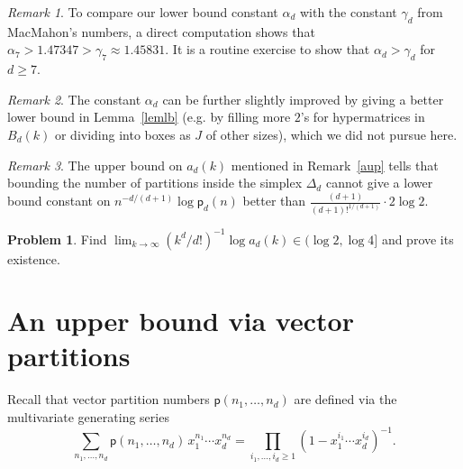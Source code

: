 \documentclass[12pt]{amsart}
\theoremstyle{definition}
\newtheorem{problem}[theorem]{Problem}
\theoremstyle{remark}
\newtheorem{remark}{Remark}
\begin{document}
\begin{remark}
To compare our lower bound constant $\alpha_d$ with the constant $\gamma_d$ from MacMahon's numbers, a direct computation shows that  
$\alpha_7 > 1.47347 > \gamma_7 \approx 1.45831$. It is a routine exercise to show that $\alpha_d > \gamma_d$ for $d \ge 7$. 
\end{remark}

\begin{remark}
The constant $\alpha_d$ can be further slightly improved by giving a better lower bound in Lemma~\ref{lemlb} (e.g. by filling more $2$'s for hypermatrices in $B_d(k)$ or dividing into boxes as $J$ of other sizes), which we did not pursue here.   
\end{remark}

\begin{remark}
The upper bound on $a_d(k)$ mentioned in Remark~\ref{aup} tells that bounding the number of partitions inside the simplex $\Delta_d$ cannot give a lower bound constant on $n^{-d/(d+1)} {\log \mathsf{p}}_d(n)$ better than $\frac{(d+1)}{(d+1)!^{1/(d+1)}} \cdot 2 \log 2$. %
\end{remark}

\begin{problem}
Find %
$
\lim_{k \to \infty} ({k^d/d!})^{-1} {\log a_d(k)} \in (\log 2, \log 4]
$
and prove its existence. %
\end{problem}


\section{An upper bound via vector partitions}\label{secvec}

Recall that vector partition numbers $\mathsf{p}(n_1,\ldots, n_d)$ are defined via the multivariate generating series 
$$
\sum_{n_1,\ldots, n_d } \mathsf{p}(n_1,\ldots, n_d)\, x_1^{n_1} \cdots x_d^{n_d}  = \prod_{i_1,\ldots, i_d \ge 1} \left(1 - x_1^{i_1} \cdots x_d^{i_d} \right)^{-1}.
$$
\end{document}
